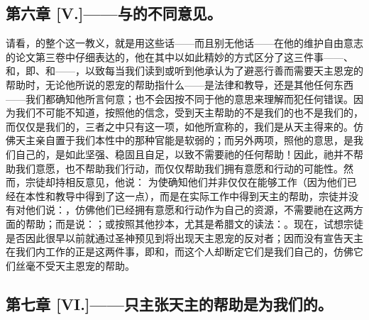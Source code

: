 
\subsection{第六章 [V.]——与的不同意见。}

请看，的整个这一教义，就是用这些话——而且别无他话——在他的维护自由意志的论文第三卷中仔细表达的，他在其中以如此精妙的方式区分了这三件事——、和，即、和——，以致每当我们读到或听到他承认为了避恶行善而需要天主恩宠的帮助时，无论他所说的恩宠的帮助指什么——是法律和教导，还是其他任何东西——我们都确知他所言何意；也不会因按不同于他的意思来理解而犯任何错误。因为我们不可能不知道，按照他的信念，受到天主帮助的不是我们的也不是我们的，而仅仅是我们的，三者之中只有这一项，如他所宣称的，我们是从天主得来的。仿佛天主亲自置于我们本性中的那种官能是软弱的；而另外两项，照他的意思，是我们自己的，是如此坚强、稳固且自足，以致不需要祂的任何帮助！因此，祂并不帮助我们意愿，也不帮助我们行动，而仅仅帮助我们拥有意愿和行动的可能性。然而，宗徒却持相反意见，他说： 为使确知他们并非仅仅在能够工作（因为他们已经在本性和教导中得到了这一点），而是在实际工作中得到天主的帮助，宗徒并没有对他们说：，仿佛他们已经拥有意愿和行动作为自己的资源，不需要祂在这两方面的帮助；而是说：；或按照其他抄本，尤其是希腊文的读法：。现在，试想宗徒是否因此很早以前就通过圣神预见到将出现天主恩宠的反对者；因而没有宣告天主在我们内工作的正是这两件事，即和，而这个人却断定它们是我们自己的，仿佛它们丝毫不受天主恩宠的帮助。\par


\subsection{第七章 [VI.]——只主张天主的帮助是为我们的。}

